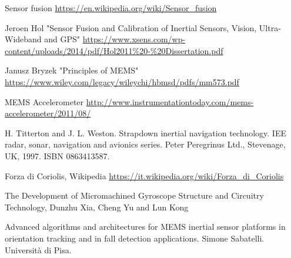 \begin{thebibliography}{99}
Sensor fusion
\url{https://en.wikipedia.org/wiki/Sensor_fusion}

Jeroen Hol "Sensor Fusion and Calibration of
Inertial Sensors, Vision,
Ultra-Wideband and GPS"
\url{https://www.xsens.com/wp-content/uploads/2014/pdf/Hol2011%20-%20Dissertation.pdf}

Janusz Bryzek "Principles of MEMS"
\url{https://www.wiley.com/legacy/wileychi/hbmsd/pdfs/mm573.pdf}


MEMS Accelerometer
\url{http://www.instrumentationtoday.com/mems-accelerometer/2011/08/}


H. Titterton and J. L. Weston. Strapdown inertial navigation technology. IEE
radar, sonar, navigation and avionics series. Peter Peregrinus Ltd., Stevenage,
UK, 1997. ISBN 0863413587.

Forza di Coriolis, Wikipedia
\url{https://it.wikipedia.org/wiki/Forza_di_Coriolis}

The Development of Micromachined Gyroscope Structure and
Circuitry Technology, Dunzhu Xia, Cheng Yu and Lun Kong


Advanced algorithms and architectures for MEMS inertial sensor platforms 
in orientation tracking and in fall detection applications. Simone Sabatelli.
Università di Pisa.




\end{thebibliography}



